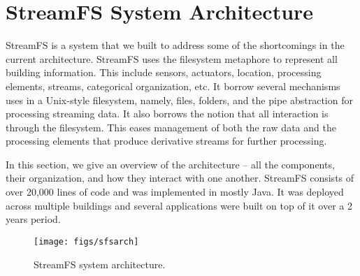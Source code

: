 \chapter{StreamFS System Architecture}

StreamFS is a system that we built to address some of the shortcomings in the current architecture.  StreamFS uses the filesystem
metaphore to represent all building information.  This include sensors, actuators, location, processing elements, 
streams, categorical organization, etc.  It borrow several mechanisms uses in a Unix-style filesystem, namely, files, folders,
and the pipe abstraction for processing streaming data.  It also borrows the notion that all interaction is through the filesystem.
This eases management of both the raw data and the processing elements that produce derivative streams for further processing.

In this section, we give an overview of the architecture -- all the components, their organization, and how they interact with one
another.  StreamFS consists of over 20,000 lines of code and was implemented in mostly Java.  It was deployed across multiple
buildings and several applications were built on top of it over a 2 years period.







\begin{figure}[t!] %
\centering
\texttt{[image: figs/sfsarch]}
\caption{StreamFS system architecture.}
\label{fig:sfsarch}
\end{figure}





